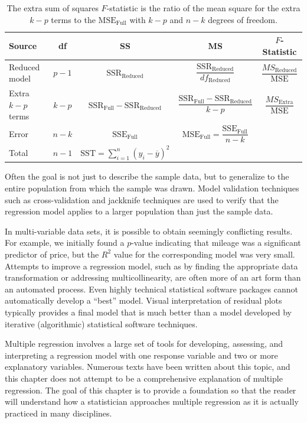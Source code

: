 \documentclass[
]{report}
\begin{document}
\begin{table}[!h]
\centering
\caption{\label{tab:tab4}The extra sum of squares $F$-statistic is the ratio of the mean square for the extra $k-p$ terms to the $\text{MSE}_{\text{Full}}$ with $k-p$ and $n-k$ degrees of freedom.}
\centering
\begin{tabular}[t]{lcccc}
\toprule
Source & df & SS & MS & $F$-Statistic\\
\midrule
Reduced model & $p - 1$ & $\text{SSR}_{\text{Reduced}}$ & $\dfrac{\text{SSR}_{\text{Reduced}}}{df_{\text{Reduced}}}$ & $\dfrac{MS_{\text{Reduced}}}{\text{MSE}}$\\
Extra $k - p$ terms & $k - p$ & $\text{SSR}_{\text{Full}} - \text{SSR}_{\text{Reduced}}$ & $\dfrac{\text{SSR}_{\text{Full}} - \text{SSR}_{\text{Reduced}}}{k-p}$ & $\dfrac{MS_{\text{Extra}}}{\text{MSE}}$\\
Error & $n - k$ & $\text{SSE}_{\text{Full}}$ & $\text{MSE}_{\text{Full}} = \dfrac{\text{SSE}_{\text{Full}}}{n - k}$ & \\
Total & $n - 1$ & $\text{SST} = \sum_{i=1}^n (y_i - \overline{y})^2$ &  & \\
\bottomrule
\end{tabular}
\end{table}

Often the goal is not just to describe the sample data, but to generalize to the entire population from which the sample was drawn. Model validation techniques such as cross-validation and jackknife techniques are used to verify that the regression model applies to a larger population than just the sample data.

In multi-variable data sets, it is possible to obtain seemingly conflicting results. For example, we initially
found a \(p\)-value indicating that mileage was a significant predictor of price, but the \(R^2\) value for the corresponding model was very small. Attempts to improve a regression model, such as by finding the appropriate data transformation or addressing multicollinearity, are often more of an art form than an automated process. Even highly technical statistical software packages cannot automatically develop a ``best'' model. Visual interpretation of residual plots typically provides a final model that is much better than a model developed by iterative (algorithmic) statistical software techniques.

Multiple regression involves a large set of tools for developing, assessing, and interpreting a regression model with one response variable and two or more explanatory variables. Numerous texts have been written about this topic, and this chapter does not attempt to be a comprehensive explanation of multiple regression. The goal of this chapter is to provide a foundation so that the reader will understand how a statistician approaches multiple regression as it is actually practiced in many disciplines.
\end{document}
